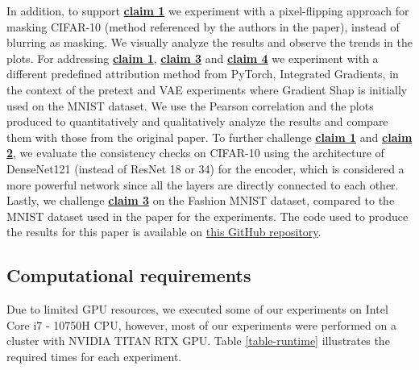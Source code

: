 In addition, to support \textbf{\hyperref[claim1]{claim 1}} we experiment with a pixel-flipping approach for masking CIFAR-10 (method referenced by the authors in the paper), instead of blurring as masking. We visually analyze the results and observe the trends in the plots. For addressing \textbf{\hyperref[claim1]{claim 1}}, \textbf{\hyperref[claim3]{claim 3}} and \textbf{\hyperref[claim4]{claim 4}}  we experiment with a different predefined attribution method from PyTorch, Integrated Gradients, in the context of the pretext and VAE experiments where Gradient Shap is initially used on the MNIST dataset. We use the Pearson correlation and the plots produced to quantitatively and qualitatively analyze the results and compare them with those from the original paper. To further challenge \textbf{\hyperref[claim1]{claim 1}} and \textbf{\hyperref[claim2]{claim 2}}, we evaluate the consistency checks on CIFAR-10 using the architecture of DenseNet121 (instead of ResNet 18 or 34) for the encoder, which is considered a more powerful network since all the layers are directly connected to each other.  Lastly, we challenge \textbf{\hyperref[claim3]{claim 3}} on the Fashion MNIST dataset, compared to the MNIST dataset used in the paper for the experiments. The code used to produce the results for this paper is available on \href{https://anonymous.4open.science/r/MLRC-Label-Free-XAI-1FC3}{this GitHub repository}.

\subsection{Computational requirements}

Due to limited GPU resources, we executed some of our experiments on Intel Core i7 - 10750H CPU, however, most of our experiments were performed on a cluster with NVIDIA TITAN RTX GPU. Table \ref{table-runtime} illustrates the required times for each experiment. 

